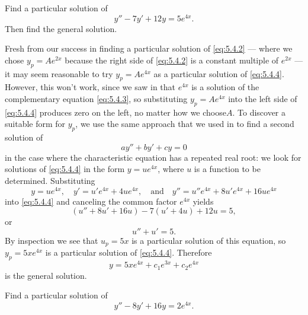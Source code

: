 \begin{example}\label{example:5.4.2}
Find a particular solution of
\begin{equation} \label{eq:5.4.4}
y''-7y'+12y=5e^{4x}.
\end{equation}
Then find the general solution.
\end{example}

\begin{solution}
Fresh from our success in finding a particular solution of
\eqref{eq:5.4.2} --- where we chose $y_p=Ae^{2x}$ because the right side
of
\eqref{eq:5.4.2} is a constant multiple of $e^{2x}$ --- it may seem
reasonable to try $y_p=Ae^{4x}$ as a particular solution of
\eqref{eq:5.4.4}. However, this won't work, since we saw in
 that $e^{4x}$ is a solution of the
complementary equation \eqref{eq:5.4.3}, so substituting $y_p=Ae^{4x}$
into the left side of \eqref{eq:5.4.4} produces zero on the left, no
matter how we choose$A$. To discover a suitable form for $y_p$,
we use the same approach that we used in  to find a
second solution of
\[
ay''+by'+cy=0
\]
in the case where the characteristic equation has a repeated real
root: we look for solutions of \eqref{eq:5.4.4} in the form $y=ue^{4x}$,
where $u$ is a function to be determined. Substituting
\begin{equation} \label{eq:5.4.5}
y=ue^{4x},\quad
y'=u'e^{4x}+4ue^{4x},\quad\text{and}\quad 
y''=u''e^{4x}+8u'e^{4x}+16ue^{4x}
\end{equation}
into \eqref{eq:5.4.4} and canceling the common factor $e^{4x}$ yields
\[
(u''+8u'+16u)-7(u'+4u)+12u=5,
\]
or
\[
u''+u'=5.
\]
By inspection we  see that $u_p=5x$ is a particular solution of
this equation, so $y_p=5xe^{4x}$ is a particular solution of
\eqref{eq:5.4.4}. Therefore
\[
y=5xe^{4x}+c_1e^{3x}+c_2e^{4x}
\]
is the general solution.
\end{solution}

\begin{example}\label{example:5.4.3}
Find a particular solution of
\begin{equation} \label{eq:5.4.6}
y''-8y'+16y=2e^{4x}.
\end{equation}
\end{example}

